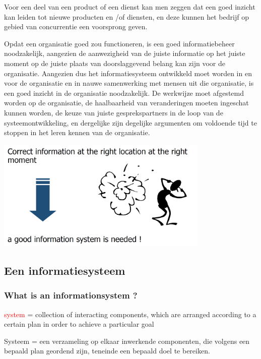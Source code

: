 Voor een deel van een product of een dienst kan men zeggen dat een goed inzicht kan leiden tot nieuwe producten en /of diensten, en deze kunnen het bedrijf op gebied van concurrentie een voorsprong geven.

Opdat een organisatie goed zou functioneren, is een goed informatiebeheer noodzakelijk, aangezien de aanwezigheid van de juiste informatie op het juiste moment op de juiste plaats van doorslaggevend belang kan zijn voor de organisatie. Aangezien dus het informatiesysteem ontwikkeld moet worden in en voor de organisatie en in nauwe samenwerking met mensen uit die organisatie, is een goed inzicht in de organisatie noodzakelijk. De werkwijze moet afgestemd worden op de organisatie, de haalbaarheid van veranderingen moeten ingeschat kunnen worden, de keuze van juiste gesprekspartners in de loop van de systeemontwikkeling, en dergelijke zijn degelijke argumenten om voldoende tijd te stoppen in het leren kennen van de organisatie.

\begin{center}
\includegraphics[width=4in]{img/theimportanceofinformation2}%
\label{The importance of information2}%
\end{center}

\subsection{Een informatiesysteem}

\subsubsection{What is an \Gls{informationsystem} ?}

\textcolor{red}{\Gls{system}} = collection of interacting components, which are arranged according to a certain plan in order to achieve a particular goal

Systeem = een verzameling op elkaar inwerkende componenten, die volgens een bepaald plan geordend zijn, teneinde een bepaald doel te bereiken.

